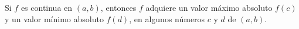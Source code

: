 \item Si $f$ es continua en $(a, b)$, entonces $f$ adquiere un valor máximo absoluto $f(c)$ y un valor mínimo absoluto $f(d)$, en algunos números $c$ y $d$ de $(a, b)$.
